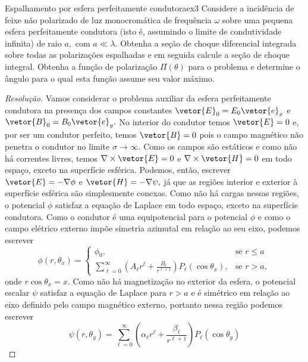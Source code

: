 \begin{exercício}{Espalhamento por esfera perfeitamente condutora}{ex3}
   Considere a incidência de feixe não polarizado de luz monocromática de frequência \(\omega\)  sobre uma pequena esfera perfeitamente condutora (isto é, assumindo o limite de condutividade infinita) de raio \(a,\) com \(a \ll \lambda.\) Obtenha a seção de choque diferencial integrada sobre todas as polarizações espalhadas e em seguida calcule a seção de choque integral. Obtenha a função de polarização \(\Pi(\theta)\) para o problema e determine o ângulo para o qual esta função assume seu valor máximo.
\end{exercício}
\begin{proof}[Resolução]
   Vamos considerar o problema auxiliar da esfera perfeitamente condutora na presença dos campos constantes \(\vetor{E}_0 = E_0\vetor{e}_x\) e \(\vetor{B}_0 = B_0\vetor{e}_y.\) No interior do condutor temos \(\vetor{E} = 0\) e, por ser um condutor perfeito, temos \(\vetor{B} = 0\) pois o campo magnético não penetra o condutor no limite \(\sigma \to \infty\). Como os campos são estáticos e como não há correntes livres, temos \(\nabla \times \vetor{E} = 0\) e \(\nabla \times \vetor{H} = 0\) em todo espaço, exceto na superfície esférica. Podemos, então, escrever \(\vetor{E} = -\nabla \phi\) e \(\vetor{H} = -\nabla\psi,\) já que as regiões interior e exterior à superfície esférica são simplesmente conexas. Como não há cargas nessas regiões, o potencial \(\phi\) satisfaz a equação de Laplace em todo espaço, exceto na superfície condutora. Como o condutor é uma equipotencial para o potencial \(\phi\) e como o campo elétrico externo impõe simetria azimutal em relação ao seu eixo, podemos escrever
   \begin{equation*}
      \phi(r,\theta_x) = \begin{cases}
         \phi_0,&\text{se }r \leq a\\
         \sum_{\ell = 0}^\infty \left(A_\ell r^\ell + \frac{B_\ell}{r^{\ell + 1}}\right)P_\ell(\cos\theta_x),&\text{se }r > a,
      \end{cases}
   \end{equation*}
   onde \(r\cos\theta_x = x.\) Como não há magnetização no exterior da esfera, o potencial escalar \(\psi\) satisfaz a equação de Laplace para \(r > a\) e é simétrico em relação ao eixo definido pelo campo magnético externo, portanto nessa região podemos escrever
   \begin{equation*}
      \psi(r,\theta_y) = \sum_{\ell = 0}^\infty \left(\alpha_\ell r^\ell + \frac{\beta_\ell}{r^{\ell + 1}}\right)P_\ell(\cos\theta_y)

\end{equation*}
\end{proof}
